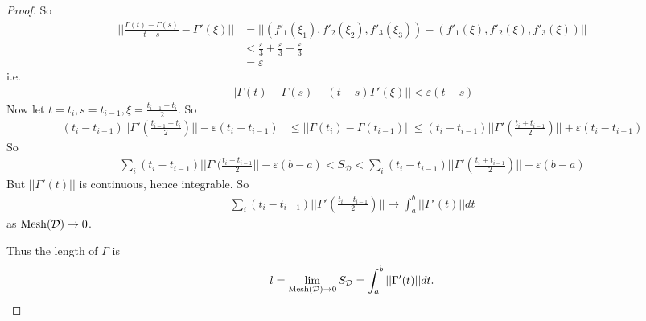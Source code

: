\documentclass[a4paper]{article}
\begin{document}
\begin{prop}
\begin{proof}
So 
\begin{equation*}
\begin{aligned}
||\frac{\Gamma(t) - \Gamma(s)}{t-s} - \Gamma'(\xi)|| &= ||(f'_1(\xi_1),f'_2(\xi_2),f'_3(\xi_3)) - (f'_1(\xi),f'_2(\xi),f'_3(\xi))||\\
&< \frac{\varepsilon}{3} + \frac{\varepsilon}{3} + \frac{\varepsilon}{3}\\
&= \varepsilon
\end{aligned}
\end{equation*}
i.e.
\begin{equation*}
\begin{aligned}
||\Gamma(t)-\Gamma(s)-(t-s)\Gamma'(\xi)|| < \varepsilon(t-s)
\end{aligned}
\end{equation*}
Now let $t=t_i,s=t_{i-1},\xi = \frac{t_{i-1}+t_i}{2}$. So
\begin{equation*}
\begin{aligned}
(t_i-t_{i-1}) ||\Gamma'(\frac{t_{i-1}+t_i}{2})|| -\varepsilon(t_i-t_{i-1}) &\leq ||\Gamma(t_i) - \Gamma(t_{i-1})|| \leq (t_i-t_{i-1}) ||\Gamma'(\frac{t_i+t_{i-1}}{2})|| + \varepsilon(t_i-t_{i-1})
\end{aligned}
\end{equation*}
So
\begin{equation*}
\begin{aligned}
\sum_i (t_i-t_{i-1}) ||\Gamma'(\frac{t_i+t_{i-1}}{2}||-\varepsilon(b-a) < S_\mathcal{D} < \sum_i (t_i-t_{i-1})||\Gamma'(\frac{t_i+t_{i-1}}{2})|| + \varepsilon(b-a)
\end{aligned}
\end{equation*}
But $||\Gamma'(t)||$ is continuous, hence integrable. So
\begin{equation*}
\begin{aligned}
\sum_i (t_i-t_{i-1})||\Gamma'(\frac{t_i+t_{i-1}}{2})|| \to \int_a^b ||\Gamma'(t)|| dt
\end{aligned}
\end{equation*}
as $\operatorname{Mesh}(\mathcal{D}) \to 0$.

Thus the length of $\Gamma$ is
\begin{equation*}
\begin{aligned}
l=\lim_{\operatorname{Mesh}(\mathcal{D}) \to 0} S_\mathcal{D} = \int_a^b ||\Gamma'(t)||dt.
\end{aligned}
\end{equation*}
\end{proof}
\end{prop}
\end{document}
